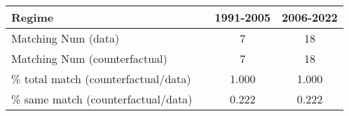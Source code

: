 
\begin{tabular}[t]{lccc}
\toprule
Regime &  & 1991-2005 & 2006-2022\\
\midrule
Matching Num (data) &  & 7 & 18\\
Matching Num (counterfactual) &  & 7 & 18\\
\% total match (counterfactual/data) &  & 1.000 & 1.000\\
\% same match (counterfactual/data) &  & 0.222 & 0.222\\
\bottomrule
\end{tabular}
